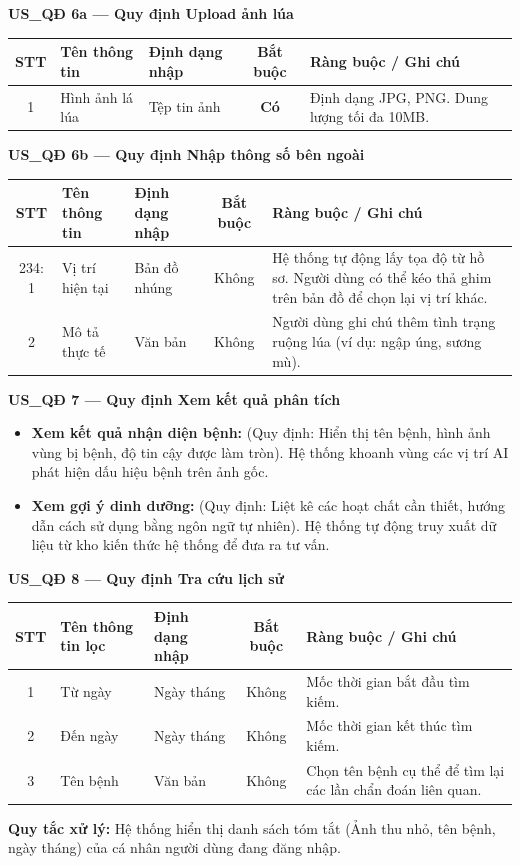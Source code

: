 \documentclass[12pt,a4paper]{article}
\begin{document}
\vspace{0.4cm}
\noindent\textbf{US\_QĐ 6a --- Quy định Upload ảnh lúa}
\begin{longtable}{|c|l|p{2.5cm}|c|p{5cm}|}
\hline
\rowcolor{headerblue}
\textbf{STT} & \textbf{Tên thông tin} & \textbf{Định dạng nhập} & \textbf{Bắt buộc} & \textbf{Ràng buộc / Ghi chú} \\
\hline
\endhead
1 & Hình ảnh lá lúa & Tệp tin ảnh & \textbf{Có} & Định dạng JPG, PNG. Dung lượng tối đa 10MB. \\
\hline
\end{longtable}

\vspace{0.4cm}
\noindent\textbf{US\_QĐ 6b --- Quy định Nhập thông số bên ngoài}
\begin{longtable}{|c|l|p{2.5cm}|c|p{5cm}|}
\hline
\rowcolor{headerblue}
\textbf{STT} & \textbf{Tên thông tin} & \textbf{Định dạng nhập} & \textbf{Bắt buộc} & \textbf{Ràng buộc / Ghi chú} \\
\hline
\endhead
234: 1 & Vị trí hiện tại & Bản đồ nhúng & Không & Hệ thống tự động lấy tọa độ từ hồ sơ. Người dùng có thể kéo thả ghim trên bản đồ để chọn lại vị trí khác. \\
\hline
2 & Mô tả thực tế & Văn bản & Không & Người dùng ghi chú thêm tình trạng ruộng lúa (ví dụ: ngập úng, sương mù). \\
\hline
\end{longtable}

\vspace{0.4cm}
\noindent\textbf{US\_QĐ 7 --- Quy định Xem kết quả phân tích}
\begin{itemize}
    \item \textbf{Xem kết quả nhận diện bệnh:} (Quy định: Hiển thị tên bệnh, hình ảnh vùng bị bệnh, độ tin cậy được làm tròn). Hệ thống khoanh vùng các vị trí AI phát hiện dấu hiệu bệnh trên ảnh gốc.
    \item \textbf{Xem gợi ý dinh dưỡng:} (Quy định: Liệt kê các hoạt chất cần thiết, hướng dẫn cách sử dụng bằng ngôn ngữ tự nhiên). Hệ thống tự động truy xuất dữ liệu từ kho kiến thức hệ thống để đưa ra tư vấn.
\end{itemize}

\vspace{0.4cm}
\noindent\textbf{US\_QĐ 8 --- Quy định Tra cứu lịch sử}
\begin{longtable}{|c|l|p{2.5cm}|c|p{5cm}|}
\hline
\rowcolor{headerblue}
\textbf{STT} & \textbf{Tên thông tin lọc} & \textbf{Định dạng nhập} & \textbf{Bắt buộc} & \textbf{Ràng buộc / Ghi chú} \\
\hline
\endhead
1 & Từ ngày & Ngày tháng & Không & Mốc thời gian bắt đầu tìm kiếm. \\
\hline
2 & Đến ngày & Ngày tháng & Không & Mốc thời gian kết thúc tìm kiếm. \\
\hline
3 & Tên bệnh & Văn bản & Không & Chọn tên bệnh cụ thể để tìm lại các lần chẩn đoán liên quan. \\
\hline
\end{longtable}
\noindent\textbf{Quy tắc xử lý:} Hệ thống hiển thị danh sách tóm tắt (Ảnh thu nhỏ, tên bệnh, ngày tháng) của cá nhân người dùng đang đăng nhập. 
\end{document}
